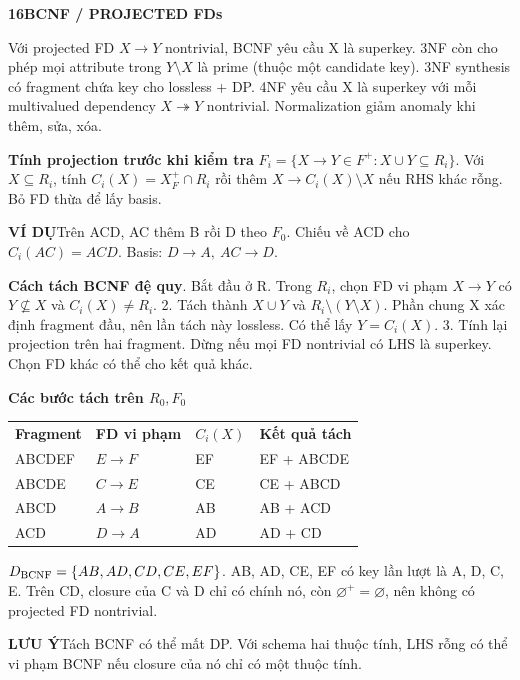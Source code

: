 \documentclass[a4paper]{article}
\newcommand{\bodyfontsize}{5.55}
\newcommand{\bodyleading}{5.2}
\newcommand{\bodylineskiplimit}{-2pt}
\newcommand{\bodystyle}{%
  \fontsize{\bodyfontsize}{\bodyleading}\selectfont\setlength{\lineskiplimit}{\bodylineskiplimit}\RaggedRight
  \setlength{\abovedisplayskip}{.5pt}\setlength{\belowdisplayskip}{.5pt}%
  \setlength{\abovedisplayshortskip}{.3pt}\setlength{\belowdisplayshortskip}{.3pt}}
\newcommand{\topic}[2]{\par\addvspace{.45pt}\nointerlineskip%
  \begingroup\setlength{\fboxsep}{0.35pt}%
  \noindent\colorbox{structure}{\parbox{\dimexpr\linewidth-2\fboxsep\relax}{%
    \color{white}\fontsize{6.45}{6.8}\selectfont\bfseries #1\enspace #2}}%
  \endgroup\par\nobreak\vspace{.55pt}\nointerlineskip\nobreak}
\newenvironment{topicblock}
  {\par\bodystyle}
  {\par}
\newcommand{\key}[1]{\par\textcolor{structure}{\textbf{#1}}\enspace}
\newcommand{\note}[4]{\par\nointerlineskip\vspace{.25pt}\begingroup\setlength{\fboxsep}{0.1pt}%
  \noindent\colorbox{#1}{\parbox{\dimexpr\linewidth-2\fboxsep\relax}{%
    \RaggedRight\textcolor{#2}{\textbf{#3}}\enspace #4}}%
  \endgroup\par\nointerlineskip\vspace{.25pt}}
\newcommand{\trap}[1]{\note{warningbg}{warning}{LƯU Ý}{#1}}
\newcommand{\ex}[1]{\note{examplebg}{example}{VÍ DỤ}{#1}}
\newlength{\sheetwidth}
\newenvironment{sheetcolumns}[1]
  {\noindent\begin{minipage}[t]{#1\sheetwidth}\vspace{0pt}\bodystyle\ignorespaces}
  {\end{minipage}\par}
\begin{document}
\begin{sheetcolumns}{.272}
\begin{topicblock}
\topic{16}{BCNF / PROJECTED FDs}
Với projected FD $X\to Y$ nontrivial, BCNF yêu cầu X là superkey. 3NF còn cho phép mọi attribute trong $Y\setminus X$ là prime (thuộc một candidate key). 3NF synthesis có fragment chứa key cho lossless + DP. 4NF yêu cầu X là superkey với mỗi multivalued dependency $X\twoheadrightarrow Y$ nontrivial. Normalization giảm anomaly khi thêm, sửa, xóa.
\key{Tính projection trước khi kiểm tra}
$F_i=\{X\to Y\in F^+:X\cup Y\subseteq R_i\}$. Với $X\subseteq R_i$, tính $C_i(X)=X_F^+\cap R_i$ rồi thêm $X\to C_i(X)\setminus X$ nếu RHS khác rỗng. Bỏ FD thừa để lấy basis.
\ex{Trên ACD, AC thêm B rồi D theo $F_0$. Chiếu về ACD cho $C_i(AC)=ACD$. Basis: $D\to A,\ AC\to D$.}
\key{Cách tách BCNF đệ quy}
1. Bắt đầu ở R. Trong $R_i$, chọn FD vi phạm $X\to Y$ có $Y\not\subseteq X$ và $C_i(X)\ne R_i$.
2. Tách thành $X\cup Y$ và $R_i\setminus(Y\setminus X)$. Phần chung X xác định fragment đầu, nên lần tách này lossless. Có thể lấy $Y=C_i(X)$.
3. Tính lại projection trên hai fragment. Dừng nếu mọi FD nontrivial có LHS là superkey. Chọn FD khác có thể cho kết quả khác.
\key{Các bước tách trên $R_0,F_0$}
\par\begin{tabular}{@{}llll@{}}
\textbf{Fragment} & \textbf{FD vi phạm} & $C_i(X)$ & \textbf{Kết quả tách}\\
ABCDEF & $E\to F$ & EF & EF + ABCDE\\
ABCDE & $C\to E$ & CE & CE + ABCD\\
ABCD & $A\to B$ & AB & AB + ACD\\
ACD & $D\to A$ & AD & AD + CD
\end{tabular}\par
$D_{\rm BCNF}=\{AB,AD,CD,CE,EF\}$. AB, AD, CE, EF có key lần lượt là A, D, C, E. Trên CD, closure của C và D chỉ có chính nó, còn $\varnothing^+=\varnothing$, nên không có projected FD nontrivial.
\trap{Tách BCNF có thể mất DP. Với schema hai thuộc tính, LHS rỗng có thể vi phạm BCNF nếu closure của nó chỉ có một thuộc tính.}
\end{topicblock}


\end{sheetcolumns}
\end{document}

